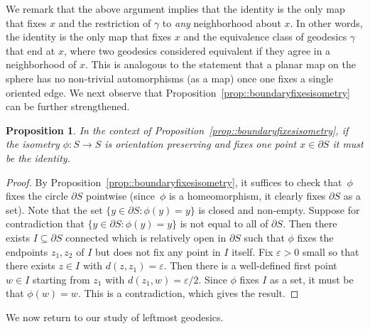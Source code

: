 \documentclass[10pt]{amsart}
\let\epsilon\varepsilon
\theoremstyle{plain}
\numberwithin{theorem}{section}
\newtheorem{proposition}[theorem]{Proposition}
\theoremstyle{definition}
\begin{document}
We remark that the above argument implies that the identity is the only map that fixes $x$ and the restriction of $\gamma$ to \emph{any} neighborhood about $x$. In other words, the identity is the only map that fixes $x$ and the equivalence class of geodesics $\gamma$ that end at $x$, where two geodesics considered equivalent if they agree in a neighborhood of $x$. This is analogous to the statement that a planar map on the sphere has no non-trivial automorphisms (as a map) once one fixes a single oriented edge. We next observe that Proposition~\ref{prop::boundaryfixesisometry} can be further strengthened.

\begin{proposition}
\label{prop::boundaryfixesisometry2}
In the context of Proposition~\ref{prop::boundaryfixesisometry}, if the isometry $\phi \colon S \to S$ is orientation preserving and fixes one point $x \in \partial S$ it must be the identity.
\end{proposition}
\begin{proof}
By Proposition~\ref{prop::boundaryfixesisometry}, it suffices to check that~$\phi$ fixes the circle $\partial S$ pointwise (since~$\phi$ is a homeomorphism, it clearly fixes $\partial S$ as a set). Note that the set $\{y \in \partial S : \phi(y) = y\}$ is closed and non-empty. Suppose for contradiction that $\{ y \in \partial S : \phi(y) = y\}$ is not equal to all of $\partial S$. Then there exists $I \subseteq \partial S$ connected which is relatively open in $\partial S$ such that $\phi$ fixes the endpoints $z_1,z_2$ of $I$ but does not fix any point in $I$ itself. Fix $\epsilon > 0$ small so that there exists $z \in I$ with $d(z,z_1) = \epsilon$. Then there is a well-defined first point $w \in I$ starting from $z_1$ with $d(z_1,w) = \epsilon/2$. Since $\phi$ fixes $I$ as a set, it must be that $\phi(w)=w$. This is a contradiction, which gives the result.
\end{proof}

We now return to our study of leftmost geodesics.
\end{document}
